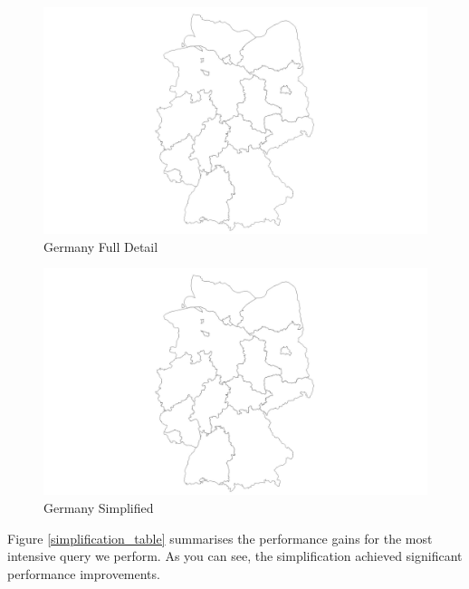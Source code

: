 \documentclass[paper=a4, fontsize=11pt]{article} %
\numberwithin{equation}{section} %
\numberwithin{figure}{section} %
\numberwithin{table}{section} %
\begin{document}
\begin{figure}[htbp]
	\centering
	\includegraphics[trim = 160mm 0mm 160mm 0mm, clip, width=1\textwidth]{pictures/germany_full}
	\caption{Germany Full Detail}
	\label{germany_full}
\end{figure}
\begin{figure}[htbp]
	\centering
	\includegraphics[trim = 160mm 0mm 160mm 0mm, clip, width=1\textwidth]{pictures/germany_simplified}
	\caption{Germany Simplified}
	\label{germany_simple}
\end{figure}

\newpage
Figure \ref{simplification_table} summarises the performance gains for the most intensive query we perform. As you can see, the simplification achieved significant performance improvements.
\end{document}
